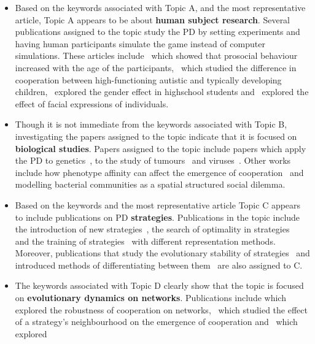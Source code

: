\begin{itemize}
    \item Based on the keywords associated with Topic A, and the most
    representative article, Topic A appears to be about \textbf{human subject
    research}. Several publications assigned to the topic study the PD by
    setting experiments and having human participants simulate the game
    instead of computer simulations. These articles include~\cite{Matsumoto2016}
    which showed that prosocial behaviour increased with the age of the
    participants,~\cite{Li20140} which studied the difference in cooperation
    between high-functioning autistic and typically developing
    children,~\cite{Molina2013} explored the gender effect in highschool
    students and~\cite{Bell2017} explored the effect of facial expressions of
    individuals.
    \item Though it is not immediate from the keywords associated with
    Topic B, investigating the papers assigned to the topic indicate that it
    is focused on \textbf{biological studies}. Papers assigned to the topic include
    papers which apply the PD to genetics~\cite{Santorelli2008, Sistrom2015}, to
    the study of tumours~\cite{archetti2013evolutionary, sartakhti2017} and
    viruses~\cite{turner1999prisoner}. Other works include how phenotype affinity
    can affect the emergence of cooperation~\cite{wu2019phenotype} and modelling
    bacterial communities as a spatial structured social dilemma.
    \item Based on the keywords and the most representative article Topic
    C appears to include publications on PD \textbf{strategies}. Publications
    in the topic include the introduction of new strategies~\cite{stewart2013extortion},
    the search of optimality in strategies~\cite{banerjee2007reaching} and the
    training of strategies~\cite{ishibuchi2011evolution} with different
    representation methods. Moreover, publications that study the evolutionary
    stability of strategies~\cite{Adami2013} and introduced methods
    of differentiating between them~\cite{Ashlock2008} are
    also assigned to C.
    \item The keywords associated with Topic D clearly show that the topic
    is focused on \textbf{evolutionary dynamics on networks}. Publications include
    \cite{ichinose2013robustness} which explored the robustness of cooperation
    on networks,~\cite{wang2012spatial} which studied the effect of a strategy's neighbourhood
    on the emergence of cooperation and~\cite{chen2016fixation} which explored

\end{itemize}
